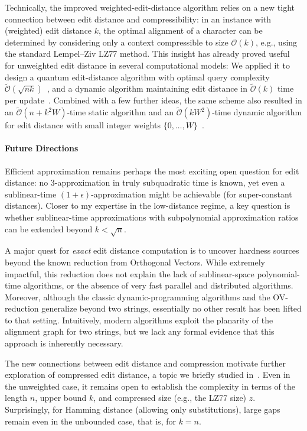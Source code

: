 \documentclass[a4paper,11pt]{article}
\newcommand{\Oh}{\mathcal{O}}
\newcommand{\Ohtilde}{\tilde{\mathcal{O}}}
\begin{document}
Technically, the improved weighted-edit-distance algorithm relies on a new tight connection between edit distance and compressibility: in an instance with (weighted) edit distance $k$, the optimal alignment of a character can be determined by considering only a context compressible to size $\Oh(k)$, e.g., using the standard Lempel--Ziv LZ77 method.
This insight has already proved useful for unweighted edit distance in several computational models:
We applied it to design a quantum edit-distance algorithm with optimal query complexity $\Ohtilde(\sqrt{nk})$~\cite{SODA2024b}, and a dynamic algorithm maintaining edit distance in $\Ohtilde(k)$ time per update~\cite{GK25}.
Combined with a few further ideas, the same scheme also resulted in an $\Ohtilde(n+k^2W)$-time static algorithm and an $\Ohtilde(kW^2)$-time dynamic algorithm for edit distance with small integer weights $\{0,\ldots,W\}$~\cite{GK25}.

\paragraph*{Future Directions}
Efficient approximation remains perhaps the most exciting open question for edit distance: no $3$-approximation in truly subquadratic time is known, yet even a sublinear-time $(1+\epsilon)$-approximation might be achievable (for super-constant distances).
Closer to my expertise in the low-distance regime, a key question is whether sublinear-time approximations with subpolynomial approximation ratios can be extended beyond $k < \sqrt{n}$. 

A major quest for \emph{exact} edit distance computation is to uncover hardness sources beyond the known reduction from Orthogonal Vectors. 
While extremely impactful, this reduction does not explain the lack of sublinear-space polynomial-time algorithms, or the absence of very fast parallel and distributed algorithms. 
Moreover, although the classic dynamic-programming algorithms and the OV-reduction generalize beyond two strings, essentially no other result has been lifted to that setting. 
Intuitively, modern algorithms exploit the planarity of the alignment graph for two strings, but we lack any formal evidence that this approach is inherently necessary.

The new connections between edit distance and compression motivate further exploration of compressed edit distance, a topic we briefly studied in~\cite{SODA2022b}. 
Even in the unweighted case, it remains open to establish the complexity in terms of the length $n$, upper bound $k$, and compressed size (e.g., the LZ77 size) $z$.
Surprisingly, for Hamming distance (allowing only substitutions), large gaps remain even in the unbounded case, that is, for $k=n$.
\end{document}
